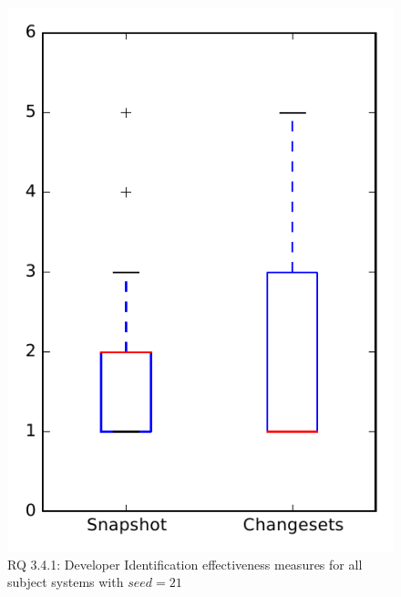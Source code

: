 
\begin{figure}
\centering
\includegraphics[height=0.4\textheight]{figures/dit_seed/rq1_overview_21}
\caption{RQ 3.4.1: Developer Identification effectiveness measures for all subject systems with $seed=21$}
\label{fig:dit_seed:rq1:overview}
\end{figure}
